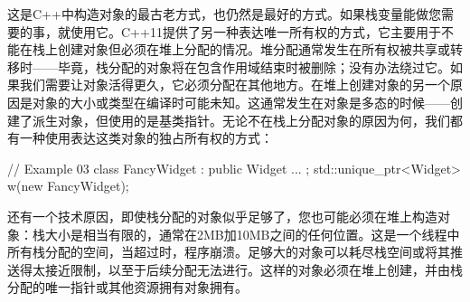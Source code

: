 这是C++中构造对象的最古老方式，也仍然是最好的方式。如果栈变量能做您需要的事，就使用它。C++11提供了另一种表达唯一所有权的方式，它主要用于不能在栈上创建对象但必须在堆上分配的情况。堆分配通常发生在所有权被共享或转移时——毕竟，栈分配的对象将在包含作用域结束时被删除；没有办法绕过它。如果我们需要让对象活得更久，它必须分配在其他地方。在堆上创建对象的另一个原因是对象的大小或类型在编译时可能未知。这通常发生在对象是多态的时候——创建了派生对象，但使用的是基类指针。无论不在栈上分配对象的原因为何，我们都有一种使用表达这类对象的独占所有权的方式：

\begin{code}
// Example 03
class FancyWidget : public Widget { ... };
std::unique_ptr<Widget> w(new FancyWidget);
\end{code}

还有一个技术原因，即使栈分配的对象似乎足够了，您也可能必须在堆上构造对象：栈大小是相当有限的，通常在2MB加10MB之间的任何位置。这是一个线程中所有栈分配的空间，当超过时，程序崩溃。足够大的对象可以耗尽栈空间或将其推送得太接近限制，以至于后续分配无法进行。这样的对象必须在堆上创建，并由栈分配的唯一指针或其他资源拥有对象拥有。

